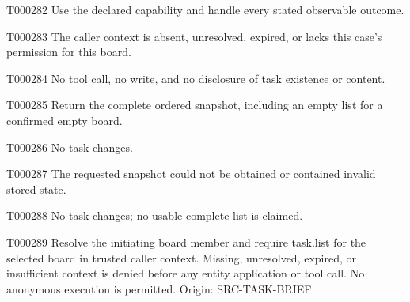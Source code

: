\documentclass[11pt,a4paper]{article}
\begin{document}
\begin{atlasparagraph}{T000282}
Use the declared capability and handle every stated observable outcome.
\end{atlasparagraph}
\begin{atlasparagraph}{T000283}
The caller context is absent, unresolved, expired, or lacks this case's permission for this board.
\end{atlasparagraph}
\begin{atlasparagraph}{T000284}
No tool call, no write, and no disclosure of task existence or content.
\end{atlasparagraph}
\begin{atlasparagraph}{T000285}
Return the complete ordered snapshot, including an empty list for a confirmed empty board.
\end{atlasparagraph}
\begin{atlasparagraph}{T000286}
No task changes.
\end{atlasparagraph}
\begin{atlasparagraph}{T000287}
The requested snapshot could not be obtained or contained invalid stored state.
\end{atlasparagraph}
\begin{atlasparagraph}{T000288}
No task changes; no usable complete list is claimed.
\end{atlasparagraph}
\begin{atlasparagraph}{T000289}
Resolve the initiating board member and require task.list for the selected board in trusted caller context. Missing, unresolved, expired, or insufficient context is denied before any entity application or tool call. No anonymous execution is permitted. Origin: SRC-TASK-BRIEF.
\end{atlasparagraph}
\end{document}
